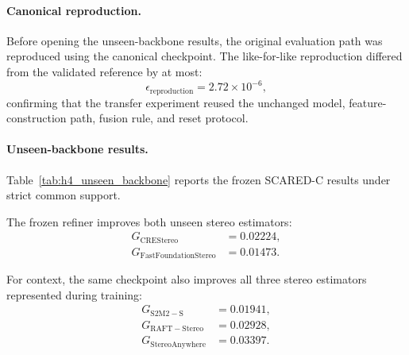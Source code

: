 \documentclass[11pt,a4paper]{article}
\begin{document}
\paragraph{Canonical reproduction.}

Before opening the unseen-backbone results, the original evaluation path was
reproduced using the canonical checkpoint. The like-for-like reproduction
differed from the validated reference by at most:
\begin{equation}
    \epsilon_{\mathrm{reproduction}}
    =
    2.72\times10^{-6},
\end{equation}
confirming that the transfer experiment reused the unchanged model,
feature-construction path, fusion rule, and reset protocol.

\paragraph{Unseen-backbone results.}

Table~\ref{tab:h4_unseen_backbone} reports the frozen SCARED-C results under
strict common support.

\begin{table}[t]
    \centering
    \caption{Frozen transfer of the bounded CODD-style \(H=4\) refiner to
    stereo backbones excluded from temporal-refiner training. Lower EPE is
    better. Gain is computed relative to the corresponding raw backbone.}
    \label{tab:h4_unseen_backbone}
\end{table}

The frozen refiner improves both unseen stereo estimators:
\begin{align}
    G_{\mathrm{CREStereo}}
    &= 0.02224,\\
    G_{\mathrm{FastFoundationStereo}}
    &= 0.01473.
\end{align}

For context, the same checkpoint also improves all three stereo estimators
represented during training:
\begin{align}
    G_{\mathrm{S2M2-S}}
    &= 0.01941,\\
    G_{\mathrm{RAFT-Stereo}}
    &= 0.02928,\\
    G_{\mathrm{StereoAnywhere}}
    &= 0.03397.
\end{align}
\end{document}
